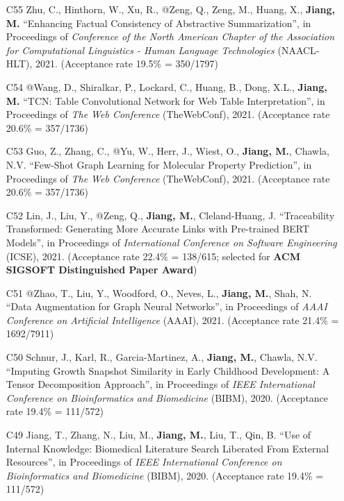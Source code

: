 \documentclass[10pt]{article}
\newenvironment{myindentpar}[1]%
{\begin{list}{}%
         {\setlength{\leftmargin}{#1}}%
         \item[]%
}
{\end{list}}
\newcounter{list}
\begin{document}
\begin{myindentpar}{0.00cm}
\begin{enumerate}[leftmargin=.5cm]
\item[C55] Zhu, C., Hinthorn, W., Xu, R., @Zeng, Q., Zeng, M., Huang, X., \textbf{Jiang, M.} ``Enhancing Factual Consistency of Abstractive Summarization'', in Proceedings of \textit{Conference of the North American Chapter of the Association for Computational Linguistics - Human Language Technologies} (NAACL-HLT), 2021. (Acceptance rate 19.5\% = 350/1797)

\item[C54] @Wang, D., Shiralkar, P., Lockard, C., Huang, B., Dong, X.L., \textbf{Jiang, M.} ``TCN: Table Convolutional Network for Web Table Interpretation'', in Proceedings of \textit{The Web Conference} (TheWebConf), 2021. (Acceptance rate 20.6\% = 357/1736)

\item[C53] Guo, Z., Zhang, C., @Yu, W., Herr, J., Wiest, O., \textbf{Jiang, M.}, Chawla, N.V. ``Few-Shot Graph Learning for Molecular Property Prediction'', in Proceedings of \textit{The Web Conference} (TheWebConf), 2021. (Acceptance rate 20.6\% = 357/1736)

\item[C52] Lin, J., Liu, Y., @Zeng, Q., \textbf{Jiang, M.}, Cleland-Huang, J. ``Traceability Transformed: Generating More Accurate Links with Pre-trained BERT Models'', in Proceedings of \textit{International Conference on Software Engineering} (ICSE), 2021. (Acceptance rate 22.4\% = 138/615; selected for \textbf{ACM SIGSOFT Distinguished Paper Award})

\item[C51] @Zhao, T., Liu, Y., Woodford, O., Neves, L., \textbf{Jiang, M.}, Shah, N. ``Data Augmentation for Graph Neural Networks'', in Proceedings of \textit{AAAI Conference on Artificial Intelligence} (AAAI), 2021. (Acceptance rate 21.4\% = 1692/7911)

\item[C50] Schnur, J., Karl, R., Garcia-Martinez, A., \textbf{Jiang, M.}, Chawla, N.V. ``Imputing Growth Snapshot Similarity in Early Childhood Development: A Tensor Decomposition Approach'', in Proceedings of \textit{IEEE International Conference on Bioinformatics and Biomedicine} (BIBM), 2020. (Acceptance rate 19.4\% = 111/572)

\item[C49] Jiang, T., Zhang, N., Liu, M., \textbf{Jiang, M.}, Liu, T., Qin, B. ``Use of Internal Knowledge: Biomedical Literature Search Liberated From External Resources'', in Proceedings of \textit{IEEE International Conference on Bioinformatics and Biomedicine} (BIBM), 2020. (Acceptance rate 19.4\% = 111/572)


\end{enumerate}
\end{myindentpar}
\end{document}
